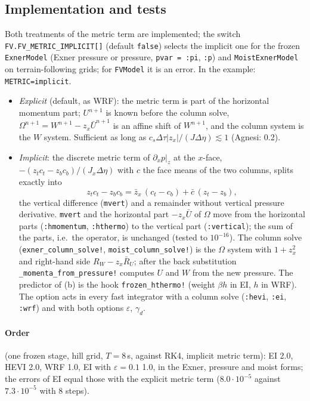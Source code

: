 \documentclass[11pt,a4paper]{article}
\newcommand{\dtau}{\Delta\tau}
\newcommand{\code}[1]{\texttt{\small #1}}
\begin{document}
\subsection{Implementation and tests}\label{sec:omegaimpl}
Both treatments of the metric term are implemented; the switch \code{FV.FV\_METRIC\_IMPLICIT[]} (default
\code{false}) selects the implicit one for the frozen \code{ExnerModel} (Exner pressure or pressure,
\code{pvar = :pi}, \code{:p}) and \code{MoistExnerModel} on terrain-following grids; for \code{FVModel} it is an error. In the
example: \code{METRIC=implicit}.
\begin{itemize}
\item \emph{Explicit} (default, as WRF): the metric term is part of the horizontal momentum part; $U^{n+1}$ is known
before the column solve, $\Omega^{n+1}=W^{n+1}-z_x\bar U^{n+1}$ is an affine shift of $W^{n+1}$, and the column system is the
$W$ system. Sufficient as long as $c_s\dtau|z_x|/(J\Delta\eta)\lesssim1$ (Agnesi: 0.2).
\item \emph{Implicit}: the discrete metric term of $\partial_xp|_z$ at the $x$-face, $-(z_tc_t-z_bc_b)/(J_x\Delta\eta)$ with $c$ the face
means of the two columns, splits exactly into
\[
z_tc_t-z_bc_b=\bar z_x\,(c_t-c_b)+\bar c\,(z_t-z_b),
\]
the vertical difference (\code{mvert}) and a remainder without vertical pressure derivative. \code{mvert} and the
horizontal part $-z_x\bar U$ of $\Omega$ move from the horizontal parts (\code{:hmomentum}, \code{:hthermo}) to the vertical part
(\code{:vertical}); the sum of the parts, i.e.\ the operator, is unchanged (tested to $10^{-16}$). The column solve
(\code{exner\_column\_solve!}, \code{moist\_column\_solve!}) is the $\Omega$ system with $1+z_x^2$ and right-hand side
$R_W-z_x\bar R_U$; after the back substitution \code{\_momenta\_from\_pressure!} computes $U$ and $W$ from the new
pressure. The predictor of (b) is the hook \code{frozen\_hthermo!} (weight $\beta h$ in EI, $h$ in WRF). The option acts
in every fast integrator with a column solve (\code{:hevi}, \code{:ei}, \code{:wrf}) and with both options $\varepsilon$, $\gamma_d$.
\end{itemize}
\paragraph{Order} (one frozen stage, hill grid, $T=8$\,s, against RK4, implicit metric term): EI 2.0, HEVI 2.0, WRF 1.0,
EI with $\varepsilon=0.1$ 1.0, in the Exner, pressure and moist forms; the errors of EI equal those with the explicit metric
term ($8.0\cdot10^{-5}$ against $7.3\cdot10^{-5}$ with 8 steps).
\end{document}
